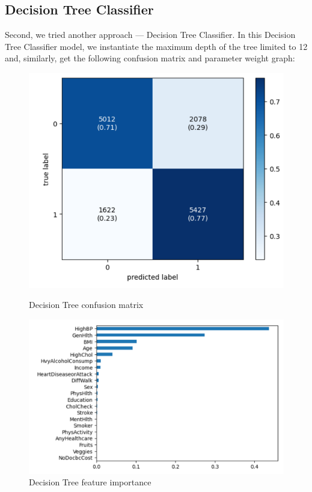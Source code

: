 \documentclass[12pt]{article}
\begin{document}
\subsection{Decision Tree Classifier}
Second, we tried another approach — Decision Tree Classifier. In this Decision Tree Classifier model, we instantiate the maximum depth of the tree limited to 12 and, similarly, get the following confusion matrix and parameter weight graph:
\begin{figure}[H]
  \centering
  \begin{minipage}[b]{0.45\textwidth}
    \centering
    \includegraphics[width=0.7\linewidth]{dectree_cm.png}
    \caption{Decision Tree confusion matrix}
  \end{minipage}\hfill
  \begin{minipage}[b]{0.45\textwidth}
    \centering
    \includegraphics[width=0.7\linewidth]{dectree_w.png}
    \caption{Decision Tree feature importance}
  \end{minipage}
\end{figure}
\end{document}
